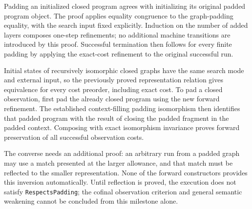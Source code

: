 




Padding an initialized closed program agrees with initializing its
original padded program object. The proof applies equality congruence to
the graph-padding equality, with the search input fixed explicitly. Induction
on the number of added layers composes one-step refinements; no additional
machine transitions are introduced by this proof. Successful termination
then follows for every finite padding by applying the exact-cost refinement
to the original successful run.




Initial states of recursively isomorphic closed graphs have the same
search mode and external input, so the previously proved representation
relation gives equivalence for every cost preorder, including exact cost.
To pad a closed observation, first pad the already closed program using the
new forward refinement. The established context-filling padding isomorphism
then identifies that padded program with the result of closing the padded
fragment in the padded context. Composing with exact isomorphism invariance
proves forward preservation of all successful observation costs.



The converse needs an additional proof: an arbitrary run from a padded
graph may use a match presented at the larger allowance, and that match must
be reflected to the smaller representation. None of the forward constructors
provides this inversion automatically. Until reflection is proved, the
execution does not satisfy \texttt{RespectsPadding}; the cofinal observation
criterion and general semantic weakening cannot be concluded from this
milestone alone.


